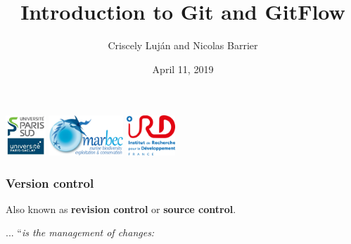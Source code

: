 \documentclass[svgnames]{beamer}
\title[Version control, Git, GitHub and GitFlow]{Introduction to Git and GitFlow}
\author{Criscely Luj\'{a}n and Nicolas Barrier}
\institute[Universit\'{e} Paris-Sud, UMR MARBEC]  
{Universit\'{e} Paris-Sud, UMR MARBEC \\ 
\medskip
\textit{criscely.lujan@ird.fr}}
\date{April 11, 2019}
\begin{document}
\begin{frame}
    \titlepage 
    \begin{center}
        \includegraphics[height=1.5cm]{img/logo_psud.jpg}
        \hspace{1em}
        \includegraphics[height=1.5cm]{img/logo_marbec.png}
        \hspace{1em}
        \includegraphics[height=1.5cm]{img/logo_ird.png}
    \end{center}
\end{frame}


\begin{frame}
    \frametitle{Version control}

    Also known as \textbf{revision control} or \textbf{source control}. \hfill \break

    ... ``\textit{is the management of changes:}

\end{frame}
\end{document}
